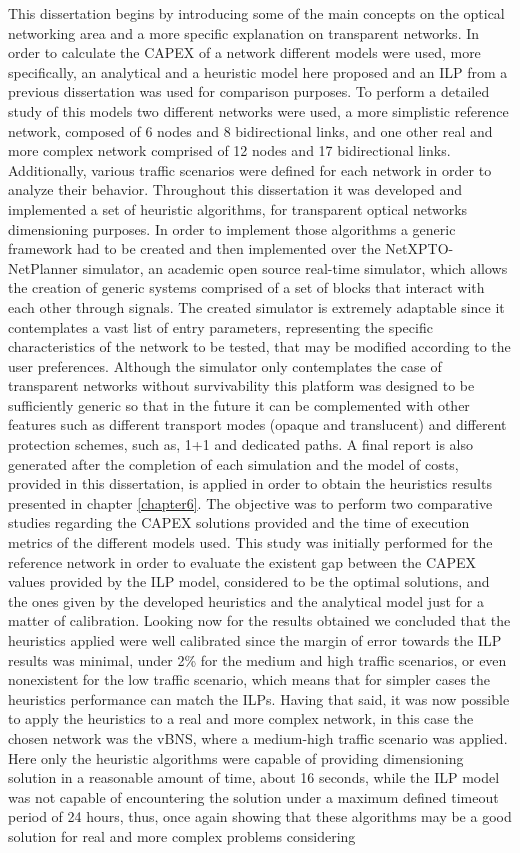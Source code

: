 This dissertation begins by introducing some of the main concepts on the optical networking area and a more specific explanation on transparent networks. In order to calculate the CAPEX of a network different models were used, more specifically, an analytical and a heuristic model here proposed and an ILP from a previous dissertation was used for comparison purposes. To perform a detailed study of this models two different networks were used, a more simplistic reference network, composed of 6 nodes and 8 bidirectional links, and one other real and more complex network comprised of 12 nodes and 17 bidirectional links. Additionally, various traffic scenarios were defined for each network in order to analyze their behavior. Throughout this dissertation it was developed and implemented a set of heuristic algorithms, for transparent optical networks dimensioning purposes.  In order to implement those algorithms a generic framework had to be created and then implemented over the NetXPTO-NetPlanner simulator, an academic open source real-time simulator, which allows the creation of generic systems comprised of a set of blocks that interact with each other through signals. The created simulator is extremely adaptable since it contemplates a vast list of entry parameters, representing the specific characteristics of the network to be tested, that may be modified according to the user preferences. Although the simulator only contemplates the case of transparent networks without survivability this platform was designed to be sufficiently generic so that in the future it can be complemented with other features such as different transport modes (opaque and translucent) and different protection schemes, such as, 1+1 and dedicated paths. A final report is also generated after the completion of each simulation and the model of costs, provided in this dissertation, is applied in order to obtain the heuristics results presented in chapter \ref{chapter6}. The objective was to perform two comparative studies regarding the CAPEX solutions provided and the time of execution metrics of the different models used. This study was initially performed for the reference network in order to evaluate the existent gap between the CAPEX values provided by the ILP model, considered to be the optimal solutions, and the ones given by the developed heuristics and the analytical model just for a matter of calibration. Looking now for the results obtained we concluded that the heuristics applied were well calibrated since the margin of error towards the ILP results was minimal, under 2\% for the medium and high traffic scenarios, or even nonexistent for the low traffic scenario, which means that for simpler cases the heuristics performance can match the ILPs. Having that said, it was now possible to apply the heuristics to a real and more complex network, in this case the chosen network was the vBNS, where a medium-high traffic scenario was applied. Here only the heuristic algorithms were capable of providing dimensioning solution in a reasonable amount of time, about 16 seconds, while the ILP model was not capable of encountering the solution under a maximum defined timeout period of 24 hours, thus, once again showing that these algorithms may be a good solution for real and more complex problems considering 